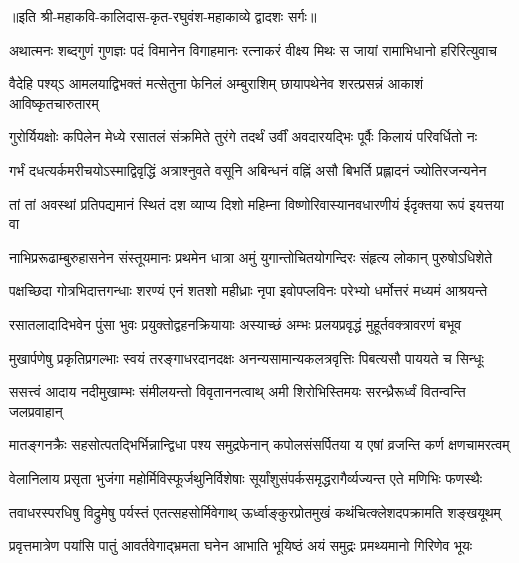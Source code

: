 ॥इति श्री-महाकवि-कालिदास-कृत-रघुवंश-महाकाव्ये द्वादशः सर्गः॥


\twolineshloka
{अथात्मनः शब्दगुणं गुणज्ञः पदं विमानेन विगाहमानः}
{रत्नाकरं वीक्ष्य मिथः स जायां रामाभिधानो हरिरित्युवाच}%

\twolineshloka
{वैदेहि पश्य्ऽ आमलयाद्विभक्तं मत्सेतुना फेनिलं अम्बुराशिम्}
{छायापथेनेव शरत्प्रसन्नं आकाशं आविष्कृतचारुतारम्}%

\twolineshloka
{गुरोर्यियक्षोः कपिलेन मेध्ये रसातलं संक्रमिते तुरंगे}
{तदर्थं उर्वीं अवदारयद्भिः पूर्वैः किलायं परिवर्धितो नः}%

\twolineshloka
{गर्भं दधत्यर्कमरीचयोऽस्माद्विवृद्धिं अत्राश्नुवते वसूनि}
{अबिन्धनं वह्निं असौ बिभर्ति प्रह्लादनं ज्योतिरजन्यनेन}%

\twolineshloka
{तां तां अवस्थां प्रतिपद्यमानं स्थितं दश व्याप्य दिशो महिम्ना}
{विष्णोरिवास्यानवधारणीयं ईदृक्तया रूपं इयत्तया वा}%

\twolineshloka
{नाभिप्ररूढाम्बुरुहासनेन संस्तूयमानः प्रथमेन धात्रा}
{अमुं युगान्तोचितयोगन्दिरः संहृत्य लोकान् पुरुषोऽधिशेते}%

\twolineshloka
{पक्षच्छिदा गोत्रभिदात्तगन्धाः शरण्यं एनं शतशो महीध्राः}
{नृपा इवोपप्लविनः परेभ्यो धर्मोत्तरं मध्यमं आश्रयन्ते}%

\twolineshloka
{रसातलादादिभवेन पुंसा भुवः प्रयुक्तोद्वहनक्रियायाः}
{अस्याच्छं अम्भः प्रलयप्रवृद्धं मुहूर्तवक्त्रावरणं बभूव}%

\twolineshloka
{मुखार्पणेषु प्रकृतिप्रगल्भाः स्वयं तरङ्गाधरदानदक्षः}
{अनन्यसामान्यकलत्रवृत्तिः पिबत्यसौ पाययते च सिन्धूः}%

\twolineshloka
{ससत्त्वं आदाय नदीमुखाम्भः संमीलयन्तो विवृताननत्वाथ्}
{अमी शिरोभिस्तिमयः सरन्ध्रैरूर्ध्वं वितन्वन्ति जलप्रवाहान्}%

\twolineshloka
{मातङ्गनक्रैः सहसोत्पतद्भिर्भिन्नान्द्विधा पश्य समुद्रफेनान्}
{कपोलसंसर्पितया य एषां व्रजन्ति कर्ण क्षणचामरत्वम्}%

\twolineshloka
{वेलानिलाय प्रसृता भुजंगा महोर्मिविस्फूर्जथुनिर्विशेषाः}
{सूर्यांशुसंपर्कसमृद्धरागैर्व्यज्यन्त एते मणिभिः फणस्थैः}%

\twolineshloka
{तवाधरस्परधिषु विद्रुमेषु पर्यस्तं एतत्सहसोर्मिवेगाथ्}
{ऊर्ध्वाङ्कुरप्रोतमुखं कथंचित्क्लेशदपक्रामति शङ्खयूथम्}%

\twolineshloka
{प्रवृत्तमात्रेण पयांसि पातुं आवर्तवेगाद्भ्रमता घनेन}
{आभाति भूयिष्ठं अयं समुद्रः प्रमथ्यमानो गिरिणेव भूयः}%


